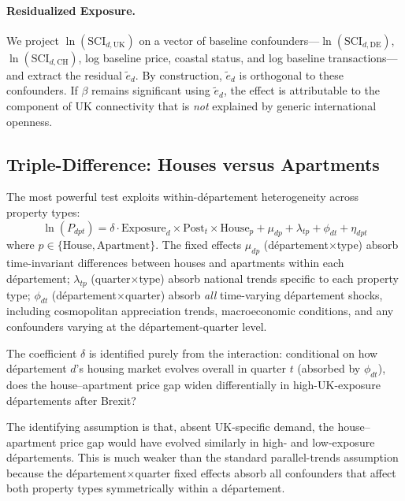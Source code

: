 \documentclass[12pt]{article}
\begin{document}
\paragraph{Residualized Exposure.} We project $\ln(\text{SCI}_{d,\text{UK}})$ on a vector of baseline confounders---$\ln(\text{SCI}_{d,\text{DE}})$, $\ln(\text{SCI}_{d,\text{CH}})$, log baseline price, coastal status, and log baseline transactions---and extract the residual $\tilde{e}_d$. By construction, $\tilde{e}_d$ is orthogonal to these confounders. If $\beta$ remains significant using $\tilde{e}_d$, the effect is attributable to the component of UK connectivity that is \textit{not} explained by generic international openness.

\subsection{Triple-Difference: Houses versus Apartments}\label{subsec:triple}

The most powerful test exploits within-d\'epartement heterogeneity across property types:
\begin{equation}\label{eq:triple}
\ln(P_{dpt}) = \delta \cdot \text{Exposure}_d \times \text{Post}_t \times \text{House}_p + \mu_{dp} + \lambda_{tp} + \phi_{dt} + \eta_{dpt}
\end{equation}
where $p \in \{\text{House}, \text{Apartment}\}$. The fixed effects $\mu_{dp}$ (d\'epartement$\times$type) absorb time-invariant differences between houses and apartments within each d\'epartement; $\lambda_{tp}$ (quarter$\times$type) absorb national trends specific to each property type; $\phi_{dt}$ (d\'epartement$\times$quarter) absorb \textit{all} time-varying d\'epartement shocks, including cosmopolitan appreciation trends, macroeconomic conditions, and any confounders varying at the d\'epartement-quarter level.

The coefficient $\delta$ is identified purely from the interaction: conditional on how d\'epartement $d$'s housing market evolves overall in quarter $t$ (absorbed by $\phi_{dt}$), does the house--apartment price gap widen differentially in high-UK-exposure d\'epartements after Brexit?

The identifying assumption is that, absent UK-specific demand, the house--apartment price gap would have evolved similarly in high- and low-exposure d\'epartements. This is much weaker than the standard parallel-trends assumption because the d\'epartement$\times$quarter fixed effects absorb all confounders that affect both property types symmetrically within a d\'epartement.
\end{document}
